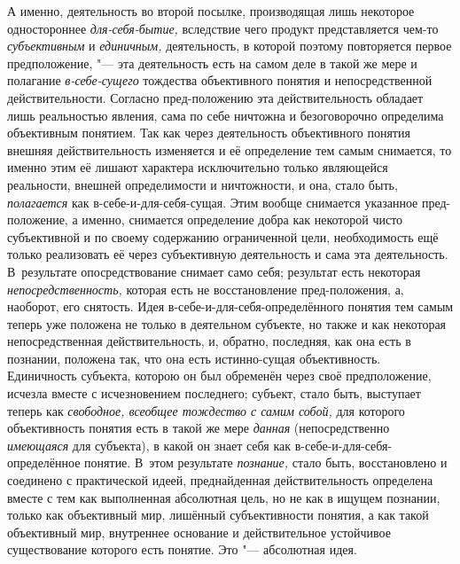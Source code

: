 А именно, деятельность во второй посылке, производящая лишь
некоторое одностороннее
{\em для-себя-бытие,}
вследствие чего продукт представляется чем-то
{\em субъективным} и
{\em единичным,}
деятельность, в которой поэтому повторяется первое
предположение, "--- эта деятельность есть на самом деле в такой
же мере и полагание {\em в-себе-сущего}
тождества объективного понятия и непосредственной
действительности. Согласно пред-положению эта действительность
обладает лишь реальностью явления, сама по себе ничтожна и безоговорочно
определима объективным понятием. Так как через деятельность объективного
понятия внешняя действительность изменяется и её определение тем самым
снимается, то именно этим её лишают характера исключительно только
являющейся реальности, внешней определимости и ничтожности, и она, стало
быть, {\em полагается}
как в-себе-и-для-себя-сущая. Этим вообще снимается указанное
пред-положение, а именно, снимается определение добра как некоторой чисто
субъективной и по своему содержанию ограниченной цели, необходимость ещё
только реализовать её через субъективную деятельность и сама эта
деятельность. В~результате опосредствование снимает само себя; результат
есть некоторая
{\em непосредственность,}
которая есть не восстановление пред-положения, а, наоборот,
его снятость. Идея в-себе-и-для-себя-определённого понятия тем самым теперь
уже положена не только в деятельном субъекте, но также и как некоторая
непосредственная действительность, и, обратно, последняя, как она есть в
познании, положена так, что она есть истинно-сущая объективность.
Единичность субъекта, которою он был обременён через своё предположение,
исчезла вместе с исчезновением последнего; субъект, стало быть, выступает
теперь как {\em свободное, всеобщее
тождество с самим собой,} для которого объективность понятия
есть в такой же мере {\em данная}
(непосредственно
{\em имеющаяся} для
субъекта), в какой он знает себя как в-себе-и-для-себя-определённое
понятие. В~этом результате
{\em познание,} стало
быть, восстановлено и соединено с практической идеей,
преднайденная действительность определена вместе с тем как выполненная
абсолютная цель, но не как в ищущем познании, только как объективный мир,
лишённый субъективности понятия, а как такой объективный мир, внутреннее
основание и действительное устойчивое существование которого есть понятие.
Это "--- абсолютная идея.

